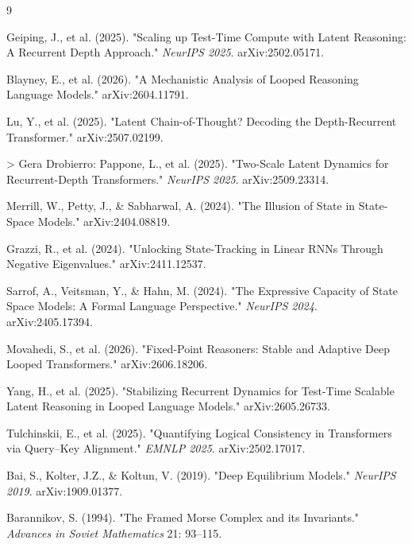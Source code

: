 \begin{thebibliography}{9}

Geiping, J., et al. (2025). "Scaling up Test-Time Compute with Latent Reasoning: A Recurrent Depth Approach." \textit{NeurIPS 2025}. arXiv:2502.05171.

Blayney, E., et al. (2026). "A Mechanistic Analysis of Looped Reasoning Language Models." arXiv:2604.11791.

Lu, Y., et al. (2025). "Latent Chain-of-Thought? Decoding the Depth-Recurrent Transformer." arXiv:2507.02199.

> Gera Drobierro:
Pappone, L., et al. (2025). "Two-Scale Latent Dynamics for Recurrent-Depth Transformers." \textit{NeurIPS 2025}. arXiv:2509.23314.

Merrill, W., Petty, J., \& Sabharwal, A. (2024). "The Illusion of State in State-Space Models." arXiv:2404.08819.

Grazzi, R., et al. (2024). "Unlocking State-Tracking in Linear RNNs Through Negative Eigenvalues." arXiv:2411.12537.

Sarrof, A., Veitsman, Y., \& Hahn, M. (2024). "The Expressive Capacity of State Space Models: A Formal Language Perspective." \textit{NeurIPS 2024}. arXiv:2405.17394.

Movahedi, S., et al. (2026). "Fixed-Point Reasoners: Stable and Adaptive Deep Looped Transformers." arXiv:2606.18206.

Yang, H., et al. (2025). "Stabilizing Recurrent Dynamics for Test-Time Scalable Latent Reasoning in Looped Language Models." arXiv:2605.26733.

Tulchinskii, E., et al. (2025). "Quantifying Logical Consistency in Transformers via Query–Key Alignment." \textit{EMNLP 2025}. arXiv:2502.17017.

Bai, S., Kolter, J.Z., \& Koltun, V. (2019). "Deep Equilibrium Models." \textit{NeurIPS 2019}. arXiv:1909.01377.

Barannikov, S. (1994). "The Framed Morse Complex and its Invariants." \textit{Advances in Soviet Mathematics} 21: 93--115.

\end{thebibliography}

